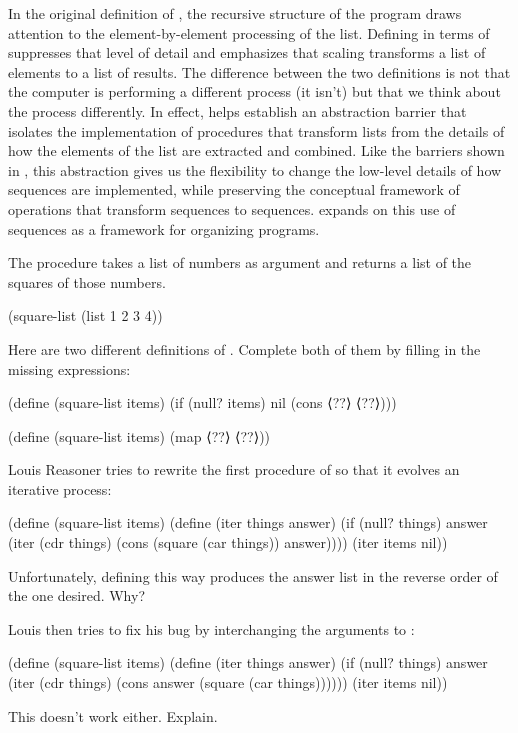 In the original definition of , the recursive structure of the program draws attention to the element-by-element processing of the list.
Defining  in terms of  suppresses that level of detail and emphasizes that scaling transforms a list of elements to a list of results.
The difference between the two definitions is not that the computer is performing a different process (it isn’t) but that we think about the process differently.
In effect,  helps establish an abstraction barrier that isolates the implementation of procedures that transform lists from the details of how the elements of the list are extracted and combined.
Like the barriers shown in , this abstraction gives us the flexibility to change the low-level details of how sequences are implemented, while preserving the conceptual framework of operations that transform sequences to sequences.
 expands on this use of sequences as a framework for organizing programs.



\begin{exercise}
	\label{Exercise 2.21}
	The procedure  takes a list of numbers as argument and returns a list of the squares of those numbers.
	\begin{scheme}
	  (square-list (list 1 2 3 4))
	  ~~
	\end{scheme}
	Here are two different definitions of \code{square-list}.
	Complete both of them by filling in the missing expressions:
	\begin{scheme}
	  (define (square-list items)
	    (if (null? items)
	        nil
	        (cons ⟨??⟩ ⟨??⟩)))

	  (define (square-list items)
	    (map ⟨??⟩ ⟨??⟩))
	\end{scheme}
\end{exercise}



\begin{exercise}
	\label{Exercise 2.22}
	Louis Reasoner tries to rewrite the first  procedure of  so that it evolves an iterative process:
	\begin{scheme}
	  (define (square-list items)
	    (define (iter things answer)
	      (if (null? things)
	          answer
	          (iter (cdr things)
	                (cons (square (car things))
	                      answer))))
	    (iter items nil))
	\end{scheme}
	Unfortunately, defining  this way produces the answer list in the reverse order of the one desired.
	Why?

	Louis then tries to fix his bug by interchanging the arguments to \code{cons}:
	\begin{scheme}
	  (define (square-list items)
	    (define (iter things answer)
	      (if (null? things)
	          answer
	          (iter (cdr things)
	                (cons answer
	                      (square (car things))))))
	    (iter items nil))
	\end{scheme}
	This doesn’t work either.
	Explain.
\end{exercise}



